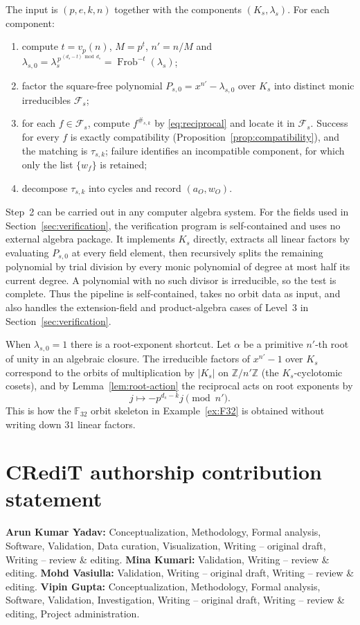 \documentclass[preprint,12pt,a4paper]{elsarticle}
\newcommand{\F}{\mathbb F}
\newcommand{\Fs}{\mathcal F_s}
\newcommand{\Frob}{\operatorname{Frob}}
\theoremstyle{definition}
\theoremstyle{remark}
\begin{document}
The input is $(p,e,k,n)$ together with the components $(K_s,\lambda_s)$.
For each component:
\begin{enumerate}
\item compute $t=v_p(n)$, $M=p^t$, $n'=n/M$ and
  $\lambda_{s,0}=\lambda_s^{\,p^{\,(d_s-t)\bmod d_s}}=\Frob^{-t}(\lambda_s)$;
\item factor the square-free polynomial $P_{s,0}=x^{n'}-\lambda_{s,0}$ over
  $K_s$ into distinct monic irreducibles $\Fs$;
\item for each $f\in\Fs$, compute $f^{\#_{s,k}}$ by \eqref{eq:reciprocal} and
  locate it in $\Fs$.  Success for every $f$ is exactly compatibility
  (Proposition~\ref{prop:compatibility}), and the matching is $\tau_{s,k}$;
  failure identifies an incompatible component, for which only the list
  $\{w_f\}$ is retained;
\item decompose $\tau_{s,k}$ into cycles and record $(a_O,w_O)$.
\end{enumerate}
Step~2 can be carried out in any computer algebra system. For the fields used
in Section~\ref{sec:verification}, the verification program is self-contained
and uses no external algebra package.  It implements $K_s$ directly,
extracts all linear factors by evaluating $P_{s,0}$ at every field element,
then recursively splits the remaining polynomial by trial division by every
monic polynomial of degree at most half its current degree.  A polynomial with
no such divisor is irreducible, so the test is complete.  Thus the pipeline
is self-contained, takes no orbit data as input, and also handles the
extension-field and product-algebra cases of Level~3 in
Section~\ref{sec:verification}.

When $\lambda_{s,0}=1$ there is a root-exponent shortcut.  Let $\alpha$ be a
primitive $n'$-th root of unity in an algebraic closure.  The irreducible
factors of $x^{n'}-1$ over $K_s$ correspond to the orbits of multiplication by
$|K_s|$ on $\mathbb{Z}/n'\mathbb{Z}$ (the $K_s$-cyclotomic cosets), and by
Lemma~\ref{lem:root-action} the reciprocal acts on root exponents by
\begin{equation}\label{eq:root-exponents}
j\longmapsto -p^{d_s-k}j\pmod{n'}.
\end{equation}
This is how the $\F_{32}$ orbit skeleton in Example~\ref{ex:F32} is obtained
without writing down $31$ linear factors.

\section*{CRediT authorship contribution statement}
\textbf{Arun Kumar Yadav:} Conceptualization, Methodology, Formal analysis,
Software, Validation, Data curation, Visualization, Writing -- original draft,
Writing -- review \& editing.
\textbf{Mina Kumari:} Validation, Writing -- review \& editing.
\textbf{Mohd Vasiulla:} Validation, Writing -- original draft, Writing --
review \& editing.
\textbf{Vipin Gupta:} Conceptualization, Methodology, Formal analysis,
Software, Validation, Investigation, Writing -- original draft, Writing --
review \& editing, Project administration.
\end{document}

